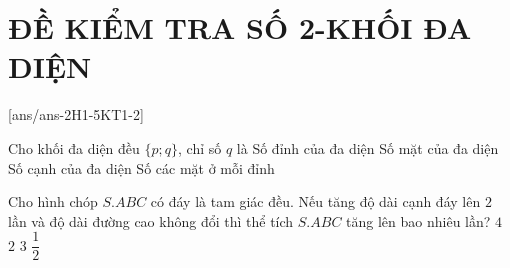 \chapter{ĐỀ KIỂM TRA SỐ 2-KHỐI ĐA DIỆN}
\setcounter{ex}{0}
[ans/ans-2H1-5KT1-2]
\begin{ex}%
	Cho khối đa diện đều $\{p;q\}$, chỉ số $q$ là
	\choice
	{Số đỉnh của đa diện}
	{Số mặt của đa diện}
	{Số cạnh của đa diện}
	{\True Số các mặt ở mỗi đỉnh}
	\loigiai{}
\end{ex}
\begin{ex}%
	Cho hình chóp $S.ABC$ có đáy là tam giác đều. Nếu tăng độ dài cạnh đáy lên $2$ lần và độ dài đường cao không đổi thì thể tích $S.ABC$ tăng lên bao nhiêu lần?
	\choice
	{\True $4$}
	{$2$}
	{$3$}
	{$\dfrac{1}{2}$}
\end{ex}
